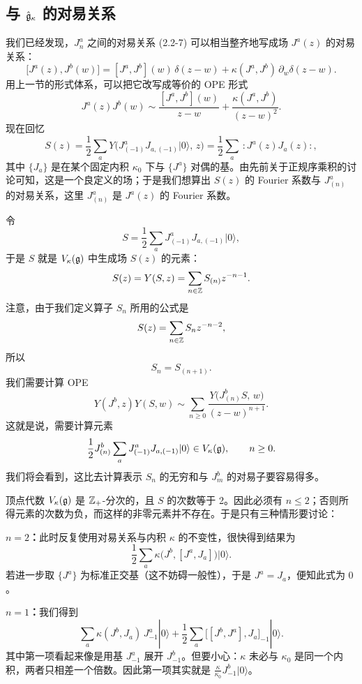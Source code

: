 \subsection{与 $\hat{\mathfrak{g}}_\kappa$ 的对易关系}

我们已经发现，$J^a_n$ 之间的对易关系 (2.2-7) 可以相当整齐地写成场 $J^a(z)$ 的对易关系：
\[
    \bigl[ J^a(z), J^b(w) \bigr] = [J^a,J^b](w)\,\delta(z-w) + \kappa (J^a,J^b)\,\partial_w\delta(z-w).
\]
用上一节的形式体系，可以把它改写成等价的 OPE 形式
\[
    J^a(z)J^b(w) \sim \frac{[J^a,J^b](w)}{z-w} + \frac{\kappa(J^a,J^b)}{(z-w)^2}.
\]
现在回忆
\[
    S(z) = \frac12\sum_a Y\bigl(J^a_{(-1)}J_{a,(-1)}|0\rangle,\, z\bigr)
         = \frac12\sum_a \,:J^a(z)J_a(z): ,
\]
其中 $\{J_a\}$ 是在某个固定内积 $\kappa_0$ 下与 $\{J^a\}$ 对偶的基。由先前关于正规序乘积的讨论可知，这是一个良定义的场；于是我们想算出 $S(z)$ 的 Fourier 系数与 $J^a_{(n)}$ 的对易关系，这里 $J^a_{(n)}$ 是 $J^a(z)$ 的 Fourier 系数。

令
\begin{equation}
    S = \frac12\sum_a J^a_{(-1)}J_{a,(-1)}|0\rangle ,
    \tag{3.1-1}
\end{equation}
于是 $S$ 就是 $V_\kappa(\mathfrak{g})$ 中生成场 $S(z)$ 的元素：
\[
    S(z) = Y(S,z) = \sum_{n\in\mathbb{Z}} S_{(n)}z^{-n-1}.
\]
注意，由于我们定义算子 $S_n$ 所用的公式是
\[
    S(z) = \sum_{n\in\mathbb{Z}} S_n z^{-n-2},
\]
所以
\[
    S_n = S_{(n+1)}.
\]
我们需要计算 OPE
\[
    Y(J^b,z)Y(S,w) \sim \sum_{n\ge 0}\frac{Y\bigl(J^b_{(n)}S,\,w\bigr)}{(z-w)^{n+1}}.
\]
这就是说，需要计算元素
\[
    \frac12 J^b_{(n)}\sum_a J^a_{(-1)}J_{a,(-1)}|0\rangle \in V_\kappa(\mathfrak{g}),
    \qquad n\ge 0.
\]
我们将会看到，这比去计算表示 $S_n$ 的无穷和与 $J^b_m$ 的对易子要容易得多。

顶点代数 $V_\kappa(\mathfrak{g})$ 是 $\mathbb{Z}_+$-分次的，且 $S$ 的次数等于 2。因此必须有 $n\le 2$；否则所得元素的次数为负，而这样的非零元素并不存在。于是只有三种情形要讨论：

\textbf{$n=2$：}此时反复使用对易关系与内积 $\kappa$ 的不变性，很快得到结果为
\[
    \frac12\sum_a \kappa\bigl(J^b,[J^a,J_a]\bigr)|0\rangle .
\]
若进一步取 $\{J^a\}$ 为标准正交基（这不妨碍一般性），于是 $J^a=J_a$，便知此式为 $0$。

\textbf{$n=1$：}我们得到
\[
    \sum_a \kappa(J^b,J_a)\,J^a_{-1}|0\rangle
    + \frac12\sum_a \bigl[[J^b,J^a],J_a\bigr]_{-1}|0\rangle .
\]
其中第一项看起来像是用基 $J^a_{-1}$ 展开 $J^b_{-1}$。但要小心：$\kappa$ 未必与 $\kappa_0$ 是同一个内积，两者只相差一个倍数。因此第一项其实就是 $\frac{\kappa}{\kappa_0}J^b_{-1}|0\rangle$。

